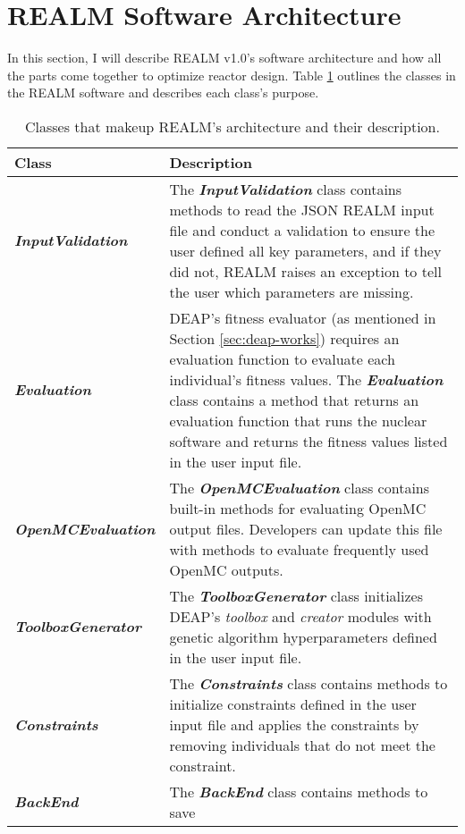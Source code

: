 \section{REALM Software Architecture}
In this section, I will describe \gls{REALM} v1.0's software architecture and 
how all the parts come together to optimize reactor design. 
Table \ref{tab:realm-architecture} outlines the classes in the REALM software 
and describes each class's purpose.
\begin{table}[]
    \centering
    \onehalfspacing
    \caption{Classes that makeup REALM's architecture and their description. }
	\label{tab:realm-architecture}
    \small
    \begin{tabular}{l|p{}}
    \hline
    \textbf{Class} & \textbf{Description} \\ \hline
    \textbf{\textit{InputValidation}} & The \textbf{\textit{InputValidation}} class contains methods 
    to read the JSON \gls{REALM} input file and conduct a validation to 
    ensure the user defined all key parameters, and if they did not, \gls{REALM} 
    raises an exception to tell the user which parameters are missing. \\
    \hline
    \textbf{\textit{Evaluation}} & \gls{DEAP}'s fitness evaluator (as mentioned in Section 
    \ref{sec:deap-works}) requires an evaluation function to evaluate each 
    individual's fitness values. 
    The \textbf{\textit{Evaluation}} class contains a method that returns an evaluation 
    function that runs the nuclear software and returns the fitness values listed 
    in the user input file. \\
    \hline 
    \textbf{\textit{OpenMCEvaluation}} & The \textbf{\textit{OpenMCEvaluation}} class contains
    built-in methods for evaluating OpenMC output files. Developers can update 
    this file with methods to evaluate frequently used OpenMC outputs. \\
    \hline 
    \textbf{\textit{ToolboxGenerator}} & The \textbf{\textit{ToolboxGenerator}} class initializes
    DEAP's \textit{toolbox} and \textit{creator} modules with genetic algorithm 
    hyperparameters defined in the user input file.\\
    \hline
    \textbf{\textit{Constraints}} & The \textbf{\textit{Constraints}} class 
    contains methods to initialize constraints defined in the user input file 
    and applies the constraints by removing individuals that do not meet the 
    constraint.\\
    \hline 
    \textbf{\textit{BackEnd}} & The \textbf{\textit{BackEnd}} class contains methods to save 

\end{tabular}
\end{table}
